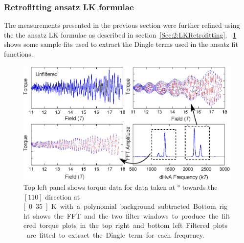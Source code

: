 \subsubsection{Retrofitting ansatz LK formulae}

The measurements presented in the previous section were further refined using the the ansatz LK formulae as described in section~\ref{Sec:2:LKRetrofitting}. \Fig~\ref{Fig:3:DingleTermExtractionFits} shows some sample fits used to extract the Dingle terms used in the ansatz fit functions.
\begin{figure}[htbp]
    \begin{center}
        \includegraphics[scale=0.9]{Chapter3-dHvABaFe2P2/Figures/Mass/FittingDingleTerm/FittingDingleTerm}
        \caption{Top left panel shows torque data for data taken at \unit[12]{\degree} towards the $[110]$ direction at \unit[0.35]{K} with a polynomial background subtracted. Bottom right shows the FFT and the two filter windows to produce the filtered torque plots in the top right and bottom left. Filtered plots are fitted to extract the Dingle term for each frequency.}
        \label{Fig:3:DingleTermExtractionFits}
    \end{center}
\end{figure}
